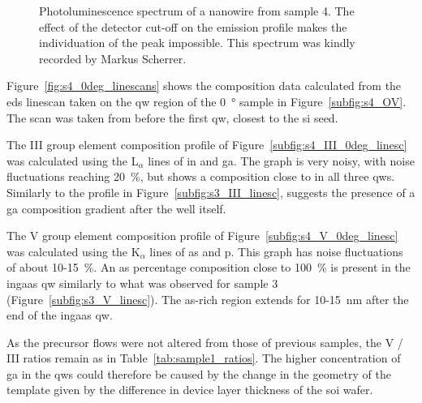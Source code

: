 \begin{figure}
    \centering
    \caption[Photoluminescence spectrum of a nanowire from sample 4.]{Photoluminescence spectrum of a nanowire from sample 4. The effect of the detector cut-off on the emission profile makes the individuation of the peak impossible. This spectrum was kindly recorded by Markus Scherrer.}
    \label{fig:s4_pl}
\end{figure}

Figure~\ref{fig:s4_0deg_linescans} shows the composition data calculated from the \acs{eds} linescan taken on the \acl{qw} region of the \qty{0}{\degree} sample in Figure~\ref{subfig:s4_OV}. The scan was taken from before the first \acl{qw}, closest to the \acl{si} seed.

The III group element composition profile of Figure~\ref{subfig:s4_III_0deg_linesc} was calculated using the L\(_\alpha\) lines of \acl{in} and \acl{ga}. The graph is very noisy, with noise fluctuations reaching \qty{20}{\%}, but shows a composition close to  in all three \acl{qw}s. Similarly to the profile in Figure~\ref{subfig:s3_III_linesc}, suggests the presence of a \acl{ga} composition gradient after the well itself. 

The V group element composition profile of Figure~\ref{subfig:s4_V_0deg_linesc} was calculated using the K\(_\alpha\) lines of \acl{as} and \acl{p}. This graph has noise fluctuations of about \num{10}-\qty{15}{\%}. An \acl{as} percentage composition close to \qty{100}{\%} is present in the \acs{ingaas} \acl{qw} similarly to what was observed for sample 3 (Figure~\ref{subfig:s3_V_linesc}). The \acs{as}-rich region extends for \num{10}-\qty{15}{\nano\metre} after the end of the \acs{ingaas} \acl{qw}.

As the precursor flows were not altered from those of previous samples, the V / III ratios remain as in Table~\ref{tab:sample1_ratios}. The higher concentration of \acl{ga} in the \acl{qw}s could therefore be caused by the change in the geometry of the template given by the difference in device layer thickness of the  \acs{soi} wafer.

